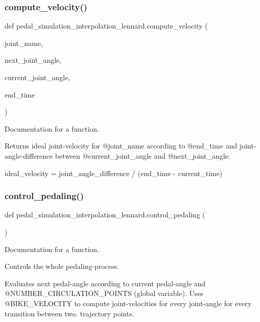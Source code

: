 \subsubsection{\texorpdfstring{compute\_velocity()}{compute\_velocity()}}
{\footnotesize\ttfamily def pedal\+\_\+simulation\+\_\+interpolation\+\_\+lennard.\+compute\+\_\+velocity (\begin{DoxyParamCaption}\item[{}]{joint\+\_\+name,  }\item[{}]{next\+\_\+joint\+\_\+angle,  }\item[{}]{current\+\_\+joint\+\_\+angle,  }\item[{}]{end\+\_\+time }\end{DoxyParamCaption})}



Documentation for a function. 

Returns ideal joint-\/velocity for @joint\+\_\+name according to @end\+\_\+time and joint-\/angle-\/difference between @current\+\_\+joint\+\_\+angle and @next\+\_\+joint\+\_\+angle\+:

ideal\+\_\+velocity = joint\+\_\+angle\+\_\+difference / (end\+\_\+time -\/ current\+\_\+time) \mbox{\label{namespacepedal__simulation__interpolation__lennard_a5dd1a3cc2835a811ad8851e5f235d1c0}} 
\subsubsection{\texorpdfstring{control\_pedaling()}{control\_pedaling()}}
{\footnotesize\ttfamily def pedal\+\_\+simulation\+\_\+interpolation\+\_\+lennard.\+control\+\_\+pedaling (\begin{DoxyParamCaption}{ }\end{DoxyParamCaption})}



Documentation for a function. 

Controls the whole pedaling-\/process.

Evaluates next pedal-\/angle according to current pedal-\/angle and @\+N\+U\+M\+B\+E\+R\+\_\+\+C\+I\+R\+C\+U\+L\+A\+T\+I\+O\+N\+\_\+\+P\+O\+I\+N\+TS (global variable). Uses @\+B\+I\+K\+E\+\_\+\+V\+E\+L\+O\+C\+I\+TY to compute joint-\/velocities for every joint-\/angle for every transition between two. trajectory points.


